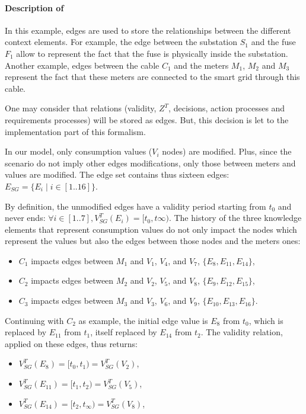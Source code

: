 \paragraph{Description of }

In this example, edges are used to store the relationships between the different context elements.
For example, the edge between the substation $S_1$ and the fuse $F_1$ allow to represent the fact that the fuse is physically inside the substation.
Another example, edges between the cable $C_1$ and the meters $M_1$, $M_2$ and $M_3$ represent the fact that these meters are connected to the smart grid through this cable.

One may consider that relations (validity, $Z^T$, decisions, action processes and requirements processes) will be stored as edges.
But, this decision is let to the implementation part of this formalism.

In our model, only consumption values ($V_i$ nodes) are modified.
Plus, since the scenario do not imply other edges modifications, only those between meters and values are modified.
The edge set contains thus sixteen edges: $E_{SG} = \{E_i \mid i \in [1..16] \}$.

By definition, the unmodified edges have a validity period starting from $t_0$ and never ends: $\forall i \in [1..7], V^T_{SG}(E_i) = [t_0, t\infty)$.
The history of the three knowledge elements that represent consumption values do not only impact the nodes which represent the values but also the edges between those nodes and the meters ones:
\begin{itemize}
	\item $C_1$ impacts edges between $M_1$ and $V_1$, $V_4$, and $V_7$, \ie $\{E_8, E_{11}, E_{14}\}$,
	\item $C_2$ impacts edges between $M_2$ and $V_2$, $V_5$, and $V_8$, \ie $\{E_9, E_{12}, E_{15}\}$,
	\item $C_3$ impacts edges between $M_3$ and $V_3$, $V_6$, and $V_9$, \ie $\{E_{10}, E_{13}, E_{16}\}$.
\end{itemize}

Continuing with $C_2$ as example, the initial edge value is $E_8$ from $t_0$, which is replaced by $E_{11}$ from $t_1$, itself replaced by $E_{14}$ from $t_2$.
The validity relation, applied on these edges, thus returns:
\begin{itemize}
	\item $V^T_{SG}(E_8) = [t_0, t_1) = V^T_{SG}(V_2)$,
	\item $V^T_{SG}(E_{11}) = [t_1, t_2) = V^T_{SG}(V_5)$,
	\item $V^T_{SG}(E_{14}) = [t_2, t_\infty) = V^T_{SG}(V_8)$,
\end{itemize}

